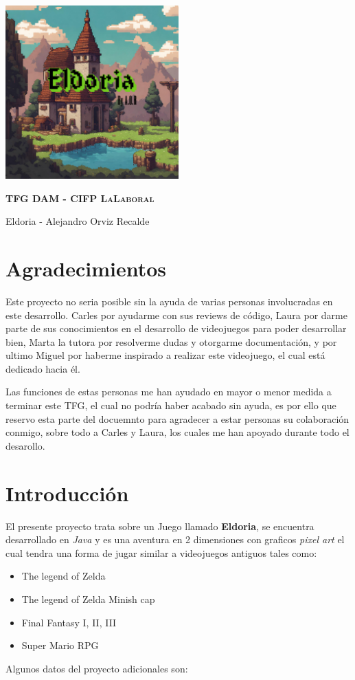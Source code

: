 \documentclass[a4paper]{article}
\begin{document}
\begin{titlepage}
    \centering %
    \includegraphics[width=0.5\textwidth]{Images/Eldoria.png}\par
    \vspace{0.4cm}
    {\scshape\LARGE\textbf{TFG DAM - CIFP LaLaboral}\par} %
    \vspace{0.4cm}
    {\LARGE\textcolor{bluePortada}{Eldoria - Alejandro Orviz Recalde}\par}
\end{titlepage}
\clearpage
\tableofcontents
\clearpage
\section{Agradecimientos}
Este proyecto no seria posible sin la ayuda de varias personas involucradas en este desarrollo. Carles por ayudarme con sus reviews de código,
Laura por darme parte de sus conocimientos en el desarrollo de videojuegos para poder desarrollar bien, Marta la tutora por resolverme dudas y otorgarme
documentación, y por ultimo Miguel por haberme inspirado a realizar este videojuego, el cual está dedicado hacia él.

Las funciones de estas personas me han ayudado en mayor o menor medida a terminar este TFG, el cual no podría haber acabado sin ayuda, es por ello que reservo
esta parte del docuemnto para agradecer a estar personas su colaboración conmigo, sobre todo a Carles y Laura, los cuales me han apoyado durante todo el desarollo.
\clearpage
\section{Introducción}
El presente proyecto trata sobre un Juego llamado \textbf{Eldoria}, se encuentra desarrollado en \textit{Java} y es una aventura en 2 dimensiones con graficos \textit{pixel art}
el cual tendra una forma de jugar similar a videojuegos antiguos tales como:
\begin{itemize}
    \item The legend of Zelda
    \item The legend of Zelda Minish cap
    \item Final Fantasy I, II, III
    \item Super Mario RPG
\end{itemize}
Algunos datos del proyecto adicionales son:
\end{document}
